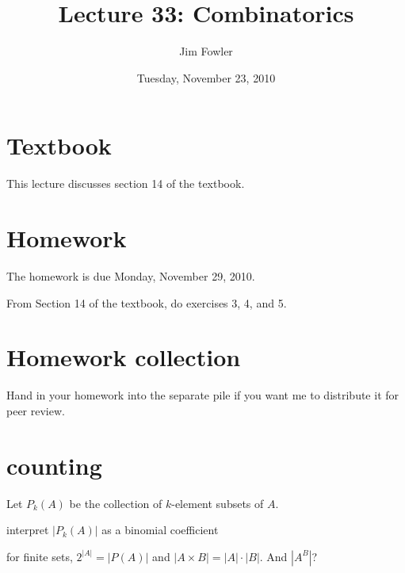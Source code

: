 \documentclass[12pt]{handout}
\title{Lecture 33: Combinatorics}
\author{Jim Fowler}
\date{Tuesday, November 23, 2010}
\begin{document}
\maketitle

\section*{Textbook}

This lecture discusses section 14 of the textbook.

\section*{Homework} 

The homework is due Monday, November 29, 2010.

From Section 14 of the textbook, do exercises 3, 4, and 5.

\section*{Homework collection}

Hand in your homework into the separate pile if you want me to
distribute it for peer review.

\section*{counting}

Let $P_k(A)$ be the collection of $k$-element subsets of $A$.

interpret $|P_k(A)|$ as a binomial coefficient

for finite sets, $2^{|A|} = |P(A)|$ and $|A \times B| = |A| \cdot
|B|$.  And $|A^B|$?
\end{document}
